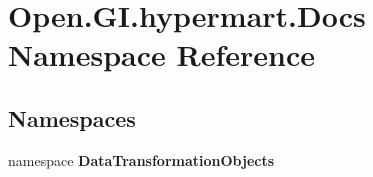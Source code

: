\section{Open.\+G\+I.\+hypermart.\+Docs Namespace Reference}
\label{namespace_open_1_1_g_i_1_1hypermart_1_1_docs}
\subsection*{Namespaces}
\begin{DoxyCompactItemize}
\item 
namespace \textbf{ Data\+Transformation\+Objects}
\end{DoxyCompactItemize}
